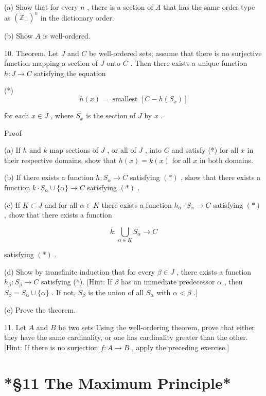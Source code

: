 \documentclass[10pt]{article}
\begin{document}
(a) Show that for every \(n\) , there is a section of \(A\) that has the same order type as \({\left( {\mathbb{Z}}_{ + }\right) }^{n}\) in the dictionary order.

(b) Show \(A\) is well-ordered.

10. Theorem. Let \(J\) and \(C\) be well-ordered sets; assume that there is no surjective function mapping a section of \(J\) onto \(C\) . Then there exists a unique function \(h : J \rightarrow  C\) satisfying the equation

(*)
\[
h\left( x\right)  = \text{ smallest }\left\lbrack  {C - h\left( {S}_{x}\right) }\right\rbrack
\]

for each \(x \in  J\) , where \({S}_{x}\) is the section of \(J\) by \(x\) .

Proof

(a) If \(h\) and \(k\) map sections of \(J\) , or all of \(J\) , into \(C\) and satisfy (*) for all \(x\) in their respective domains, show that \(h\left( x\right)  = k\left( x\right)\) for all \(x\) in both domains.

(b) If there exists a function \(h : {S}_{\alpha } \rightarrow  C\) satisfying \(\left( *\right)\) , show that there exists a function \(k \cdot  {S}_{\alpha } \cup  \{ \alpha \}  \rightarrow  C\) satisfying \(\left( *\right)\) .

(c) If \(K \subset  J\) and for all \(\alpha  \in  K\) there exists a function \({h}_{\alpha } \cdot  {S}_{\alpha } \rightarrow  C\) satisfying \(\left( *\right)\) , show that there exists a function

\[
k : \mathop{\bigcup }\limits_{{\alpha  \in  K}}{S}_{\alpha } \rightarrow  C
\]

satisfying \(\left( *\right)\) .

(d) Show by transfinite induction that for every \(\beta  \in  J\) , there exists a function \({h}_{\beta } : {S}_{\beta } \rightarrow  C\) satisfying (*). [Hint: If \(\beta\) has an immediate predecessor \(\alpha\) , then \({S}_{\beta } = {S}_{\alpha } \cup  \{ \alpha \}\) . If not, \({S}_{\beta }\) is the union of all \({S}_{\alpha }\) with \(\alpha  < \beta\) .]

(e) Prove the theorem.

11. Let \(A\) and \(B\) be two sets Using the well-ordering theorem, prove that either they have the same cardinality, or one has cardinality greater than the other. [Hint: If there is no surjection \(f : A \rightarrow  B\) , apply the preceding exercise.]

\section*{*§11 The Maximum Principle*}
\end{document}
